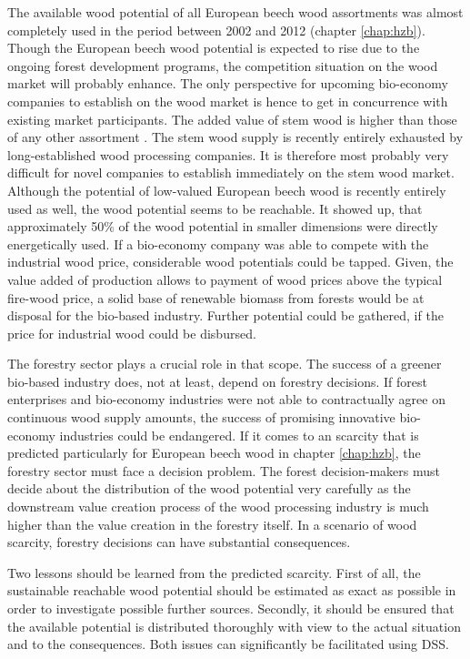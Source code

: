 The available wood potential of all European beech wood assortments was almost completely used in the period between 2002 and 2012 (chapter \ref{chap:hzb}). Though the European beech wood potential is expected to rise due to the ongoing forest development programs, the competition situation on the wood market will probably enhance. The only perspective for upcoming bio-economy companies to establish on the wood market is hence to get in concurrence with existing market participants. The added value of stem wood is higher than those of any other assortment \citep{nagel_2008}. The stem wood supply is recently entirely exhausted by long-established wood processing companies. It is therefore most probably very difficult for novel companies to establish immediately on the stem wood market. Although the potential of low-valued European beech wood is recently entirely used as well, the wood potential seems to be reachable. It showed up, that approximately 50\% of the wood potential in smaller dimensions were directly energetically used. If a bio-economy company was able to compete with the industrial wood price, considerable wood potentials could be tapped. Given, the value added of production allows to payment of wood prices above the typical fire-wood price, a solid base of renewable biomass from forests would be at disposal for the bio-based industry. Further potential could be gathered, if the price for industrial wood could be disbursed.

The forestry sector plays a crucial role in that scope. The success of a greener bio-based industry does, not at least, depend on forestry decisions. If forest enterprises and bio-economy industries were not able to contractually agree on continuous wood supply amounts, the success of promising innovative bio-economy industries could be endangered. If it comes to an scarcity that is predicted particularly for European beech wood in chapter \ref{chap:hzb}, the forestry sector must face a decision problem. The forest decision-makers must decide about the distribution of the wood potential very carefully as the downstream value creation process of the wood processing industry is much higher than the value creation in the forestry itself. In a scenario of wood scarcity, forestry decisions can have substantial consequences.

Two lessons should be learned from the predicted scarcity. First of all, the sustainable reachable wood potential should be estimated as exact as possible in order to investigate possible further sources. Secondly, it should be ensured that the available potential is distributed thoroughly with view to the actual situation and to the consequences. Both issues can significantly be facilitated using DSS.

